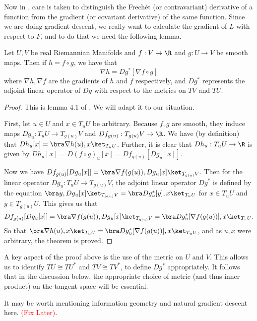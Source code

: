 Now in \citep{patternnet}, care is taken to distinguish the Frech\'et (or contravariant) derivative of a function from the gradient (or covariant derivative) of the same function.  %
Since we are doing gradient descent, we really want to calculate the gradient of $L$ with respect to $F$, and to do that we need the following lemma.
\begin{lemm}\label{gradChain}
Let $U,V$ be real Riemannian Manifolds and $f:V\rightarrow \R$ and $g:U\rightarrow V$ be smooth maps.  Then if $h=f\circ g$, we have that 
\[\nabla h=Dg^{*}[\nabla f\circ g]\]
where $\nabla h,\nabla f$ are the gradients of $h$ and $f$ respectively, and $Dg^{*}$ represents the adjoint linear operator of $Dg$ with respect to the metrics on $TV$ and $TU$.
\end{lemm}
\begin{proof}
This is  lemma 4.1 of \citep{matGradChain}. We will adapt it to our situation. 

First, let $u \in U$ and $x\in T_uU$ be arbitrary. Because $f,g$ are smooth, they induce maps $Dg_u:T_uU\rightarrow T_{g(u)}V$ and $Df_{g(u)}:T_{g(u)}V\rightarrow \R$.
We have (by definition) that $Dh_u[x]=\bra \nabla h(u),x\ket_{T_uU}$. Further, it is clear that $Dh_u:T_uU\rightarrow\R$ is given by $Dh_u[x]=D(f\circ g)_u[x]=Df_{g(u)}[Dg_u[x]]$. 

Now we have $Df_{g(u)}[Dg_u[x]]=\bra\nabla f(g(u)),Dg_u[x]\ket_{T_{g(u)}V}$.  Then for the linear operator $Dg_u:T_uU\rightarrow T_{g(u)}V$, the adjoint linear operator $Dg^{*}$ is defined by the equation $\bra y,Dg_u[x]\ket_{T_{g(u)}V}=\bra Dg_u^{*}[y],x\ket_{T_uU}$ for $x\in T_uU$ and $y\in T_{g(u)}U$.  This gives us that 
\[Df_{g(u)}[Dg_u[x]]=\bra\nabla f(g(u)),Dg_u[x]\ket_{T_{g(u)}V}=\bra Dg_u^{*}[\nabla f(g(u))],x\ket_{T_uU}.\]
So that $\bra \nabla h(u),x\ket_{T_uU}=\bra Dg_u^{*}[\nabla f(g(u))],x\ket_{T_uU}$, and as $u,x$ were arbitrary, the theorem is proved.
\end{proof}

A key aspect of the proof above is the use of the metric on $U$ and $V$. This allows us to identify $TU\cong TU^{*}$ and  $TV\cong TV^{*}$, to define $Dg^{*}$ appropriately.  It follows that in the discussion below, the appropriate choice of metric (and thus inner product) on the tangent space will be essential.

It may be worth mentioning information geometry and natural gradient descent here. \textcolor{red}{(Fix Later)}.

